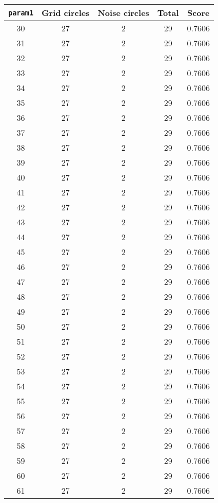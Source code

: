 \documentclass[letterpaper, 12pt]{article}
\begin{document}
\begin{longtable}{|c|c|c|c|c|}
\hline
\textbf{\texttt{param1}} & \textbf{Grid circles} & \textbf{Noise circles} & \textbf{Total} & \textbf{Score} \\
\hline
30 & 27 & 2 & 29 & 0.7606 \\
\hline
31 & 27 & 2 & 29 & 0.7606 \\
\hline
32 & 27 & 2 & 29 & 0.7606 \\
\hline
33 & 27 & 2 & 29 & 0.7606 \\
\hline
34 & 27 & 2 & 29 & 0.7606 \\
\hline
35 & 27 & 2 & 29 & 0.7606 \\
\hline
36 & 27 & 2 & 29 & 0.7606 \\
\hline
37 & 27 & 2 & 29 & 0.7606 \\
\hline
38 & 27 & 2 & 29 & 0.7606 \\
\hline
39 & 27 & 2 & 29 & 0.7606 \\
\hline
40 & 27 & 2 & 29 & 0.7606 \\
\hline
41 & 27 & 2 & 29 & 0.7606 \\
\hline
42 & 27 & 2 & 29 & 0.7606 \\
\hline
43 & 27 & 2 & 29 & 0.7606 \\
\hline
44 & 27 & 2 & 29 & 0.7606 \\
\hline
45 & 27 & 2 & 29 & 0.7606 \\
\hline
46 & 27 & 2 & 29 & 0.7606 \\
\hline
47 & 27 & 2 & 29 & 0.7606 \\
\hline
48 & 27 & 2 & 29 & 0.7606 \\
\hline
49 & 27 & 2 & 29 & 0.7606 \\
\hline
50 & 27 & 2 & 29 & 0.7606 \\
\hline
51 & 27 & 2 & 29 & 0.7606 \\
\hline
52 & 27 & 2 & 29 & 0.7606 \\
\hline
53 & 27 & 2 & 29 & 0.7606 \\
\hline
54 & 27 & 2 & 29 & 0.7606 \\
\hline
55 & 27 & 2 & 29 & 0.7606 \\
\hline
56 & 27 & 2 & 29 & 0.7606 \\
\hline
57 & 27 & 2 & 29 & 0.7606 \\
\hline
58 & 27 & 2 & 29 & 0.7606 \\
\hline
59 & 27 & 2 & 29 & 0.7606 \\
\hline
60 & 27 & 2 & 29 & 0.7606 \\
\hline
61 & 27 & 2 & 29 & 0.7606 \\

\end{longtable}
\end{document}
